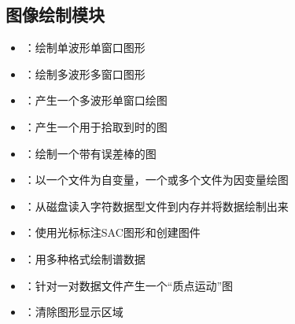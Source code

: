 \subsection*{图像绘制模块}
\begin{itemize}
\item {}：绘制单波形单窗口图形
\item {}：绘制多波形多窗口图形
\item {}：产生一个多波形单窗口绘图
\item {}：产生一个用于拾取到时的图
\item {}：绘制一个带有误差棒的图
\item {}：以一个文件为自变量，一个或多个文件为因变量绘图
\item {}：从磁盘读入字符数据型文件到内存并将数据绘制出来
\item {}：使用光标标注SAC图形和创建图件
\item {}：用多种格式绘制谱数据
\item {}：针对一对数据文件产生一个``质点运动''图
\item {}：清除图形显示区域
\end{itemize}


